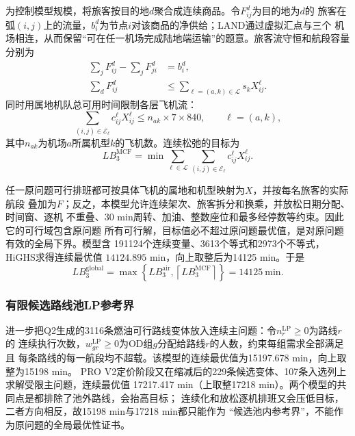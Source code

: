 \documentclass[UTF8,a4paper,zihao=5]{ctexart}
\begin{document}
为控制模型规模，将旅客按目的地$d$聚合成连续商品。令$F_{ij}^{d}$为目的地为$d$的
旅客在弧$(i,j)$上的流量，$b_i^d$为节点$i$对该商品的净供给；LAND通过虚拟汇点与三个
机场相连，从而保留“可在任一机场完成陆地端运输”的题意。旅客流守恒和航段容量分别为
\begin{align}
  \sum_jF_{ij}^{d}-\sum_jF_{ji}^{d}&=b_i^d,
  \label{eq:q3-passenger-flow-balance}\\
  \sum_dF_{ij}^{d}&\leq
  \sum_{\ell=(a,k)\in \mathcal{L}}s_kX_{ij}^{\ell}.
  \label{eq:q3-layered-seat-capacity}
\end{align}
同时用属地机队总可用时间限制各层飞机流：
\begin{equation}
  \sum_{(i,j)\in \mathcal{E}_\ell}c_{ij}^{\ell}X_{ij}^{\ell}
  \leq n_{ak}\times7\times840,
  \qquad \ell=(a,k),
  \label{eq:q3-layered-fleet-time}
\end{equation}
其中$n_{ak}$为机场$a$所属机型$k$的飞机数。连续松弛的目标为
\begin{equation}
  LB_3^{\mathrm{MCF}}
  =\min\sum_{\ell\in \mathcal{L}}\sum_{(i,j)\in \mathcal{E}_\ell}
  c_{ij}^{\ell}X_{ij}^{\ell}.
  \label{eq:q3-mcf-lower-bound}
\end{equation}

任一原问题可行排班都可按具体飞机的属地和机型映射为$X$，并按每名旅客的实际航段
叠加为$F$；反之，本模型允许连续架次、旅客拆分和换乘，并放松日期分配、时间窗、逐机
不重叠、30 min周转、加油、整数座位和最多经停数等约束。因此它的可行域包含原问题
所有可行解，目标值必不超过原问题最优值，是对原问题有效的全局下界。模型含
191124个连续变量、3613个等式和2973个不等式，HiGHS求得连续最优值
$14124.895$ min，向上取整后为14125 min。于是
\begin{equation}
  LB_3^{\mathrm{global}}
  =\max\left\{LB_3^{\mathrm{air}},\left\lceil LB_3^{\mathrm{MCF}}\right\rceil\right\}
  =14125\ \mathrm{min}.
  \label{eq:q3-enhanced-global-lb}
\end{equation}

\subsubsection{有限候选路线池LP参考界}

进一步把Q2生成的3116条燃油可行路线变体放入连续主问题：令$n_r^{\mathrm{LP}}\geq0$为路线$r$的
连续执行次数，$w_{gr}^{\mathrm{LP}}\geq0$为OD组$g$分配给路线$r$的人数，约束每组需求全部满足且
每条路线的每一航段均不超载。该模型的连续最优值为15197.678 min，向上取整为15198 min。
PRO V2定价阶段又在缩减后的229条候选变体、107条入选列上求解受限主问题，连续最优值
17217.417 min（上取整17218 min）。两个模型的共同点是都排除了池外路线，会抬高目标；
连续化和放松逐机排班又会压低目标，二者方向相反，故15198 min与17218 min都只能作为
“候选池内参考界”，不能作为原问题的全局最优性证书。
\end{document}
